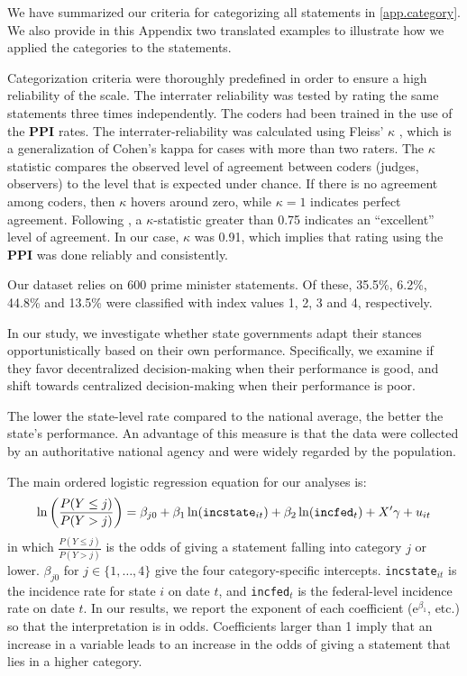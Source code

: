 \documentclass[authoryear,12pt, 3p]{elsarticle}
\theoremstyle{break}
\begin{document}
We have summarized our criteria for categorizing all statements in \ref{app.category}. We also provide in this Appendix two translated examples to illustrate how we applied the categories to the statements.

Categorization criteria were thoroughly predefined in order to ensure a high reliability of the scale. The interrater reliability was tested by rating the same statements three times independently. The coders had been trained in the use of the \textbf{PPI} rates. The interrater-reliability was calculated using Fleiss’ $\kappa$ \citep[][Ch.~18]{Fleiss2003}, which is a generalization of Cohen’s kappa for cases with more than two raters. The $\kappa$ statistic compares the observed level of agreement between coders (judges, observers) to the level that is expected under chance. If there is no agreement among coders, then ${\kappa}$ hovers around zero, while ${\kappa}=1$ indicates perfect agreement. Following \cite{Fleiss2003}, a $\kappa$-statistic greater than 0.75 indicates an ``excellent'' level of agreement. In our case, $\kappa$ was 0.91, which implies that rating using the \textbf{PPI} was done reliably and consistently.

Our dataset relies on 600 prime minister statements. Of these, 35.5\%, 6.2\%, 44.8\% and 13.5\% were classified with index values 1, 2, 3 and 4, respectively.

In our study, we investigate whether state governments adapt their stances opportunistically based on their own performance. Specifically, we examine if they favor decentralized decision-making when their performance is good, and shift towards centralized decision-making when their performance is poor. 

The lower the state-level rate compared to the national average, the better the state's performance. An advantage of this measure is that the data were collected by an authoritative national agency and were widely regarded by the population.

The main ordered logistic regression equation for our analyses is:
\begin{equation} \label{eq.regression01}
	\ln \left( \frac{P(Y \leq j)}{P(Y > j)} \right) = \beta_{j0} + \beta_1 \ln(\text{\texttt{incstate}}_{it}) + \beta_2 \ln(\text{\texttt{incfed}}_{t}) + X' \gamma + u_{it} 
\end{equation}
in which $\frac{P(Y \leq j)}{P(Y > j)}$ is the odds of giving a statement falling into category $j$ or lower. $\beta_{j0}$ for $j \in \{1,\ldots,4\}$ give the four category-specific intercepts. \texttt{incstate}$_{it}$ is the incidence rate for state $i$ on date $t$, and \texttt{incfed}$_{t}$ is the federal-level incidence rate on date $t$. In our results, we report the exponent of each coefficient ($\mathrm{e}^{\beta_1}$, etc.) so that the interpretation is in odds. Coefficients larger than 1 imply that an increase in a variable leads to an increase in the odds of giving a statement that lies in a higher category. 
\end{document}
